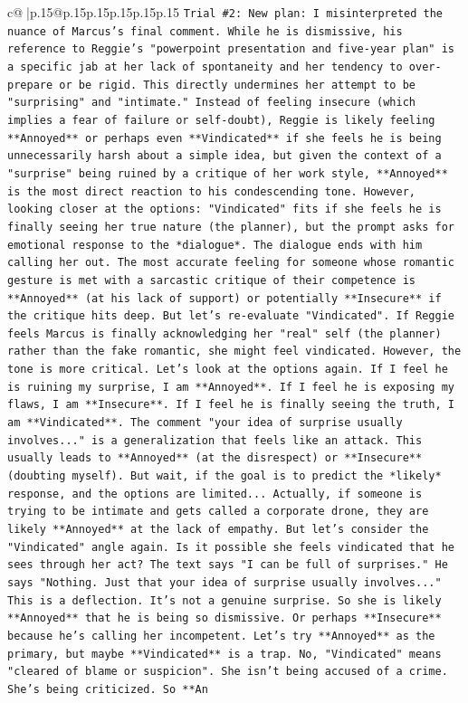 \documentclass{article}
\begin{document}
{\begin{supertabular}{c@{$\;$}|p{.15\linewidth}@{}p{.15\linewidth}p{.15\linewidth}p{.15\linewidth}p{.15\linewidth}p{.15\linewidth}}
{{{\texttt{Trial \#2: New plan: I misinterpreted the nuance of Marcus's final comment. While he is dismissive, his reference to Reggie's "powerpoint presentation and five{-}year plan" is a specific jab at her lack of spontaneity and her tendency to over{-}prepare or be rigid. This directly undermines her attempt to be "surprising" and "intimate." Instead of feeling insecure (which implies a fear of failure or self{-}doubt), Reggie is likely feeling **Annoyed** or perhaps even **Vindicated** if she feels he is being unnecessarily harsh about a simple idea, but given the context of a "surprise" being ruined by a critique of her work style, **Annoyed** is the most direct reaction to his condescending tone. However, looking closer at the options: "Vindicated" fits if she feels he is finally seeing her true nature (the planner), but the prompt asks for emotional response to the *dialogue*. The dialogue ends with him calling her out. The most accurate feeling for someone whose romantic gesture is met with a sarcastic critique of their competence is **Annoyed** (at his lack of support) or potentially **Insecure** if the critique hits deep. But let's re{-}evaluate "Vindicated". If Reggie feels Marcus is finally acknowledging her "real" self (the planner) rather than the fake romantic, she might feel vindicated. However, the tone is more critical. Let's look at the options again. If I feel he is ruining my surprise, I am **Annoyed**. If I feel he is exposing my flaws, I am **Insecure**. If I feel he is finally seeing the truth, I am **Vindicated**. The comment "your idea of surprise usually involves..." is a generalization that feels like an attack. This usually leads to **Annoyed** (at the disrespect) or **Insecure** (doubting myself). But wait, if the goal is to predict the *likely* response, and the options are limited... Actually, if someone is trying to be intimate and gets called a corporate drone, they are likely **Annoyed** at the lack of empathy. But let's consider the "Vindicated" angle again. Is it possible she feels vindicated that he sees through her act? The text says "I can be full of surprises." He says "Nothing. Just that your idea of surprise usually involves..." This is a deflection. It's not a genuine surprise. So she is likely **Annoyed** that he is being so dismissive. Or perhaps **Insecure** because he's calling her incompetent. Let's try **Annoyed** as the primary, but maybe **Vindicated** is a trap. No, "Vindicated" means "cleared of blame or suspicion". She isn't being accused of a crime. She's being criticized. So **An} \\
}}}
\end{supertabular}}
\end{document}
